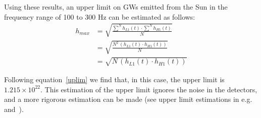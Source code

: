 Using these results, an upper limit on GWs emitted from the Sun in the frequency range of 100 to 300 Hz can be estimated as follows:
\begin{eqnarray}
\label{uplim}
h_{max} & = \sqrt{\frac{ \sum^N h_{L1}(t) \cdot \sum^N h_{H1}(t)}{N}} \\[10pt] \nonumber
& = \sqrt{\frac{ N^2 \, (h_{L1}(t) \cdot  h_{H1}(t))}{N}} \\[10pt] \nonumber
& = \sqrt{ N \, (h_{L1}(t) \cdot  h_{H1}(t))} \nonumber
\end{eqnarray}

Following equation~\ref{uplim} we find that, in this case, the upper limit is $1.215 \times 10^{22}$.
This estimation of the upper limit ignores the noise in the detectors, and a more rigorous estimation can be made (see upper limit estimations in e.g.~\cite{bh1} and~\cite{bh2}).